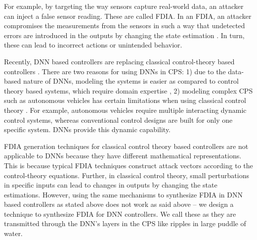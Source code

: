 For example, by targeting the way sensors capture real-world data, an attacker can inject a false sensor reading. These are called \ac{FDIA}. In an FDIA, an attacker compromises the measurements from the sensors in such a way that undetected errors are introduced in the outputs by changing the state estimation \cite{7438916}. In turn, these can lead to incorrect actions or unintended behavior. 



Recently,  \ac{DNN} based controllers are replacing classical control-theory based controllers \cite{xiang18} \cite{Kocic2019} \cite{bechtel2017deeppicar}. There are two reasons for using DNNs in CPS: %
1) due to the data-based nature of DNNs, modeling the systems is easier as compared to control theory based systems, which require domain expertise \cite{Aamir_2013}, 2) modeling complex CPS such as autonomous vehicles has certain limitations when using classical control theory \cite{article23}. For example, autonomous vehicles require multiple interacting dynamic control systems, whereas conventional control designs are built for only one specific system. DNNs provide this dynamic capability.

FDIA generation techniques for classical control theory based controllers \cite{10.1145/1952982.1952995} are not applicable to DNNs because they have different mathematical representations. This is because typical FDIA techniques construct attack vectors according to the control-theory equations. %
Further, in classical control theory, small perturbations in specific inputs can lead to changes in outputs by changing the state estimations. %
However, using the same mechanisms to synthesize FDIA in DNN  based controllers as stated above does not work as said above %
-- we design a technique to synthesize FDIA for DNN controllers. We call these \attack as they are transmitted through the DNN's layers in the CPS like ripples in large puddle of water. %

